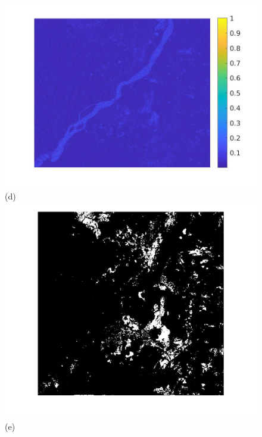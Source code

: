 \documentclass[journal]{IEEEtran}
\begin{document}
\begin{figure}[htp!]
\includegraphics[scale=.13]{../../figs/forest_aggreg_ratios}\hspace{-.5cm}(d)\\
\includegraphics[scale=.10]{../../figs/forest_wecs_change_space}\hspace{-.5cm}(e) 

\end{figure}
\end{document}
